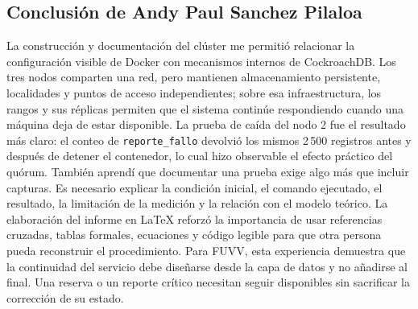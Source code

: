 \documentclass[12pt,a4paper]{article}
\begin{document}
\subsection{Conclusión de Andy Paul Sanchez Pilaloa}

La construcción y documentación del clúster me permitió relacionar la configuración visible de Docker con mecanismos internos de CockroachDB. Los tres nodos comparten una red, pero mantienen almacenamiento persistente, localidades y puntos de acceso independientes; sobre esa infraestructura, los rangos y sus réplicas permiten que el sistema continúe respondiendo cuando una máquina deja de estar disponible. La prueba de caída del nodo 2 fue el resultado más claro: el conteo de \texttt{reporte\_fallo} devolvió los mismos 2\,500 registros antes y después de detener el contenedor, lo cual hizo observable el efecto práctico del quórum. También aprendí que documentar una prueba exige algo más que incluir capturas. Es necesario explicar la condición inicial, el comando ejecutado, el resultado, la limitación de la medición y la relación con el modelo teórico. La elaboración del informe en LaTeX reforzó la importancia de usar referencias cruzadas, tablas formales, ecuaciones y código legible para que otra persona pueda reconstruir el procedimiento. Para FUVV, esta experiencia demuestra que la continuidad del servicio debe diseñarse desde la capa de datos y no añadirse al final. Una reserva o un reporte crítico necesitan seguir disponibles sin sacrificar la corrección de su estado.

\printbibliography[heading=bibintoc,title={Bibliografía}]
\end{document}
